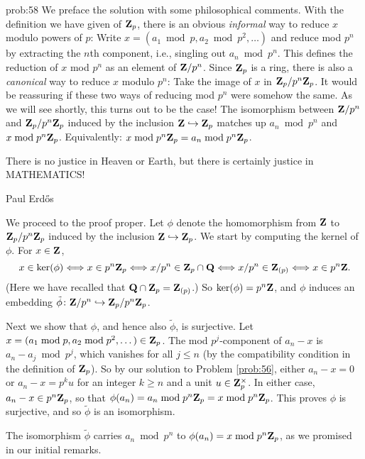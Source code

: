 \begin{sol}{prob:58} We preface the solution with some philosophical comments. With the definition we have given of $\mathbf{Z}_p$, there is an obvious \emph{informal} way to reduce $x$ modulo powers of $p$: Write $x=(a_1\bmod{p}, a_2\bmod{p^2}, \dots)$ and reduce mod $p^n$ by extracting the $n$th component, i.e., singling out $a_n\bmod{p^n}$. This defines the reduction of $x$ mod $p^n$ as an element of $\mathbf{Z}/p^n$. Since $\mathbf{Z}_p$ is a ring, there is also a \emph{canonical} way to reduce $x$ modulo $p^n$: Take the image of $x$ in $\mathbf{Z}_p/p^n\mathbf{Z}_p$. It would be reassuring if these two ways of reducing mod $p^n$ were somehow the same. As we will see shortly, this turns out to be the case! The isomorphism between $\mathbf{Z}/p^n$ and $\mathbf{Z}_p/p^n\mathbf{Z}_p$ induced by the inclusion $\mathbf{Z}\hookrightarrow \mathbf{Z}_p$  matches up $a_n\bmod{p^n}$ and $x\bmod{p^n\mathbf{Z}_p}$. Equivalently: $x\bmod{p^n\mathbf{Z}_p} = a_n\bmod{p^n\mathbf{Z}_p}$.

\epigraph{There is no justice in Heaven or Earth, but there is certainly justice in MATHEMATICS!}{Paul Erd\H{o}s}

We proceed to the proof proper. Let $\phi$ denote the homomorphism from $\mathbf{Z}$ to $\mathbf{Z}_p/p^n\mathbf{Z}_p$ induced by the inclusion $\mathbf{Z}\hookrightarrow \mathbf{Z}_p$. We start by computing the kernel of $\phi$. For $x \in \mathbf{Z}$,
\[ x \in \ker(\phi) \Longleftrightarrow
x \in p^n\mathbf{Z}_{p} \Longleftrightarrow x/p^n \in \mathbf{Z}_{p}\cap \mathbf{Q} \Longleftrightarrow x/p^n \in \mathbf{Z}_{(p)} \Longleftrightarrow x \in p^n\mathbf{Z}.
\]
(Here we have recalled that $\mathbf{Q}\cap \mathbf{Z}_{p} = \mathbf{Z}_{(p)}$.) So $\ker(\phi) = p^n\mathbf{Z}$, and $\phi$ induces an embedding $\tilde{\phi}\colon \mathbf{Z}/p^n \hookrightarrow \mathbf{Z}_p/p^n\mathbf{Z}_p$.

Next we show that $\phi$, and hence also $\tilde{\phi}$, is surjective.  Let $x = (a_1\bmod{p},a_2\bmod{p^2},\dots) \in \mathbf{Z}_{p}$. The mod $p^j$-component of $a_n-x$ is $a_n - a_j \bmod{p^j}$, which vanishes for all $j\le n$ (by the compatibility condition in the definition of $\mathbf{Z}_p$). So by our solution to Problem \ref{prob:56}, either $a_n-x=0$ or $a_n-x = p^k u$ for an integer $k \ge n$ and a unit $u \in \mathbf{Z}_p^{\times}$. In either case, $a_n-x \in p^n \mathbf{Z}_p$, so that $\phi(a_n) = a_n\bmod{p^n\mathbf{Z}_p} = x\bmod{p^n\mathbf{Z}_p}$. This proves $\phi$ is surjective, and so $\tilde{\phi}$ is an isomorphism. 

The isomorphism $\tilde{\phi}$ carries $a_n\bmod{p^n}$ to $\phi(a_n) =x\bmod{p^n\mathbf{Z}_{p}}$, as we promised in our initial remarks.
\end{sol}

